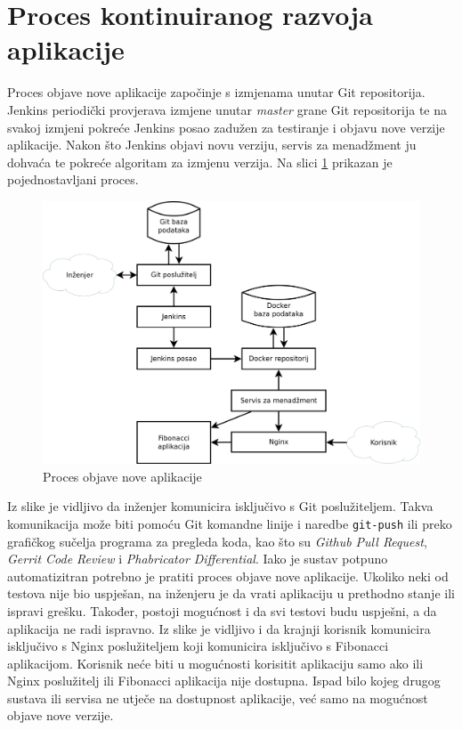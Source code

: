 \section{Proces kontinuiranog razvoja aplikacije}
Proces objave nove aplikacije započinje s izmjenama unutar Git repositorija. Jenkins periodički
provjerava izmjene unutar \textit{master} grane Git repositorija te na svakoj izmjeni pokreće
Jenkins posao zadužen za testiranje i objavu nove verzije aplikacije. Nakon što Jenkins objavi novu
verziju, servis za menadžment ju dohvaća te pokreće algoritam za izmjenu verzija. Na slici
\ref{fig:03workflow} prikazan je pojednostavljani proces.

\begin{figure}[h]
    \centering
    \includegraphics[width=\textwidth]{img/03/workflow.png}
    \caption{Proces objave nove aplikacije}%
    \label{fig:03workflow}
\end{figure}

Iz slike je vidljivo da inženjer komunicira isključivo s Git poslužiteljem. Takva komunikacija može
biti pomoću Git komandne linije i naredbe \texttt{git-push} ili preko grafičkog sučelja programa za
pregleda koda, kao što su \textit{Github Pull Request}, \textit{Gerrit Code Review} i
\textit{Phabricator Differential}. Iako je sustav potpuno automatizitran potrebno je pratiti proces
objave nove aplikacije. Ukoliko neki od testova nije bio uspješan, na inženjeru je da vrati
aplikaciju u prethodno stanje ili ispravi grešku. Također, postoji mogućnost i da svi testovi budu
uspješni, a da aplikacija ne radi ispravno. Iz slike je vidljivo i da krajnji korisnik komunicira
isključivo s Nginx poslužiteljem koji komunicira isključivo s Fibonacci aplikacijom. Korisnik neće
biti u mogućnosti korisitit aplikaciju samo ako ili Nginx poslužitelj ili Fibonacci aplikacija nije
dostupna. Ispad bilo kojeg drugog sustava ili servisa ne utječe na dostupnost aplikacije, već samo
na mogućnost objave nove verzije.
